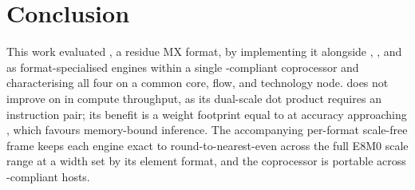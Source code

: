\section{Conclusion}
\label{sec:conclusion}

This work evaluated \fpfourres, a residue MX format, by implementing it
alongside \fpfour, \fpeight, and \mtwo{} as format-specialised engines within a
single \xif-compliant coprocessor and characterising all four on a common core,
flow, and technology node. \fpfourres{} does not improve on \fpeight{} in
compute throughput, as its dual-scale dot product requires an instruction pair;
its benefit is a weight footprint equal to \fpfour{} at accuracy approaching
\fpeight, which favours memory-bound inference. The accompanying per-format
scale-free frame keeps each engine exact to round-to-nearest-even across the
full E8M0 scale range at a width set by its element format, and the coprocessor
is portable across \xif-compliant hosts.

